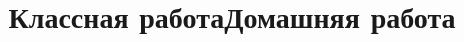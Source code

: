 \title{Классная работа}
\begin{enumcols}[label=\textbf{\arabic*.}]
	\item {}
	\item {}
	\item {}
	\item {}
	\item {}
	\item {}
	\item {}
\end{enumcols}
\title{Домашняя работа}
\begin{enumcols}[label=\textbf{\arabic*.}]
	\item {}
	\item {}
	\item {}
	\item {}
	\item {}
\end{enumcols}